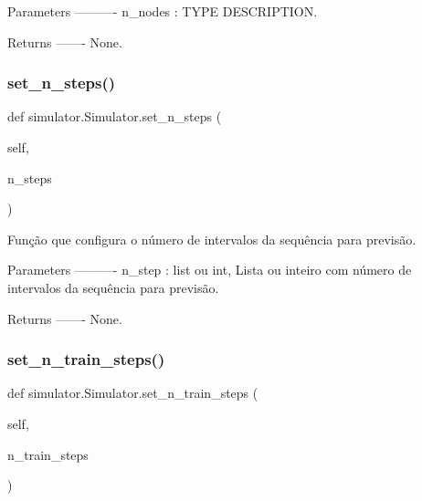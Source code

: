 \begin{DoxyVerb}Parameters
----------
n_nodes : TYPE
    DESCRIPTION.

Returns
-------
None.\end{DoxyVerb}
 \mbox{\label{classsimulator_1_1Simulator_a0d6a95bda569d042c1d762f59af562b5}} 
\subsubsection{\texorpdfstring{set\+\_\+n\+\_\+steps()}{set\_n\_steps()}}
{\footnotesize\ttfamily def simulator.\+Simulator.\+set\+\_\+n\+\_\+steps (\begin{DoxyParamCaption}\item[{}]{self,  }\item[{}]{n\+\_\+steps }\end{DoxyParamCaption})}

\begin{DoxyVerb}Função que configura o número de intervalos da sequência para previsão.

Parameters
----------
n_step : list ou int,
    Lista ou inteiro com número de intervalos da sequência para previsão.

Returns
-------
None.\end{DoxyVerb}
 \mbox{\label{classsimulator_1_1Simulator_af88917d7bc1833f4fdbcbb57bc0c9de6}} 
\subsubsection{\texorpdfstring{set\+\_\+n\+\_\+train\+\_\+steps()}{set\_n\_train\_steps()}}
{\footnotesize\ttfamily def simulator.\+Simulator.\+set\+\_\+n\+\_\+train\+\_\+steps (\begin{DoxyParamCaption}\item[{}]{self,  }\item[{}]{n\+\_\+train\+\_\+steps }\end{DoxyParamCaption})}

